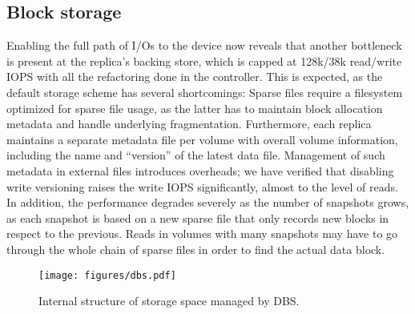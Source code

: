 \subsection{Block storage}


Enabling the full path of I/Os to the device now reveals that another bottleneck is present at the replica's backing store, which is capped at 128k/38k read/write IOPS with all the refactoring done in the controller.
This is expected, as the default storage scheme has several shortcomings: Sparse files require a filesystem optimized for sparse file usage, as the latter has to maintain block allocation metadata and handle underlying fragmentation. Furthermore, each replica maintains a separate metadata file per volume with overall volume information, including the name and ``version'' of the latest data file. Management of such metadata in external files introduces overheads; we have verified that disabling write versioning raises the write IOPS significantly, almost to the level of reads. In addition, the performance degrades severely as the number of snapshots grows, as each snapshot is based on a new sparse file that only records new blocks in respect to the previous. Reads in volumes with many snapshots may have to go through the whole chain of sparse files in order to find the actual data block.

\begin{figure}[thb]
    \centering
    \texttt{[image: figures/dbs.pdf]}
    \caption{Internal structure of storage space managed by DBS.}
    \label{fig:dbs}
\end{figure}

